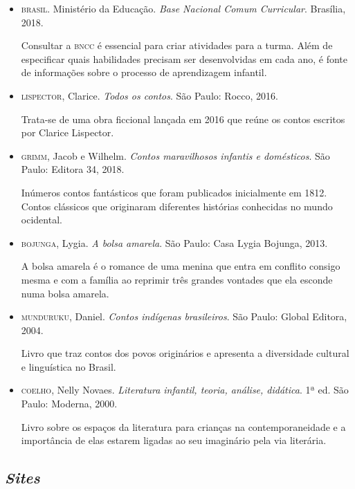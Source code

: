 \documentclass[11pt]{extarticle}
\begin{document}
\begin{itemize}
\item \textsc{brasil}. Ministério da Educação. \textit{Base Nacional Comum Curricular}. Brasília, 2018.

Consultar a \textsc{bncc} é essencial para criar atividades para a turma. Além de especificar quais habilidades precisam ser desenvolvidas em cada ano, é fonte de informações sobre o processo de aprendizagem infantil. 

\item \textsc{lispector}, Clarice. \textit{Todos os contos}. São Paulo: Rocco, 2016.

Trata-se de uma obra ficcional lançada em 2016 que reúne os contos escritos por Clarice Lispector. 
 
\item \textsc{grimm}, Jacob e Wilhelm. \textit{Contos maravilhosos infantis e domésticos}. São Paulo: Editora 34, 2018.

Inúmeros contos fantásticos que foram publicados inicialmente em 1812. Contos clássicos que originaram diferentes histórias conhecidas no mundo ocidental.

\item \textsc{bojunga}, Lygia. \textit{A bolsa amarela}. São Paulo: Casa Lygia Bojunga, 2013.

A bolsa amarela é o romance de uma menina que entra em conflito consigo mesma e com a família ao reprimir três grandes vontades que ela esconde numa bolsa amarela.

\item \textsc{munduruku}, Daniel. \textit{Contos indígenas brasileiros}. São Paulo: Global Editora, 2004.

Livro que traz contos dos povos originários e apresenta a diversidade cultural e linguística no Brasil.

\item \textsc{coelho}, Nelly Novaes. \textit{Literatura infantil, teoria, análise, didática}. 1ª ed. São Paulo: Moderna, 2000.

Livro sobre os espaços da literatura para crianças na contemporaneidade e a importância de elas estarem ligadas ao seu imaginário pela via literária.

\end{itemize}

\subsection{\textit{Sites}}
\end{document}
